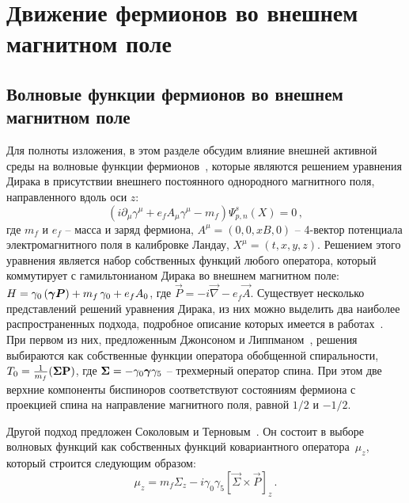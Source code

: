 \section{Движение фермионов во внешнем магнитном поле}\label{Ch:Fermion}
\subsection{Волновые функции фермионов во внешнем магнитном поле}
Для полноты изложения, в этом разделе обсудим влияние внешней активной среды на волновые функции фермионов~\cite{KM_Book_2013}, которые являются решением уравнения Дирака в присутствии внешнего постоянного однородного магнитного поля, направленного вдоль оси $z$:
\begin{equation}\label{eq:Dirac}
	(i\partial_\mu \gamma^\mu + e_f A_\mu \gamma^\mu - m_f) \Psi^s_{p,n}(X)=0\, ,
\end{equation}
где $m_f$ и $e_f$ -- масса и заряд фермиона, $A^\mu=\left(0,0,xB,0\right)$ -- 4-вектор потенциала электромагнитного поля в калибровке 
Ландау, $X^\mu=\left(t,x,y,z\right)$. Решением этого уравнения является набор собственных функций любого оператора, который 
коммутирует с гамильтонианом Дирака во внешнем магнитном поле: $H = \gamma_0 
\left( {\boldsymbol \gamma} {\boldsymbol P} \right) + m_f \, \gamma_0 + e_f A_0$, где $\vec{P} 
= -i \vec{\nabla} - e_f \vec{A}$. Существует несколько представлений решений 
уравнения Дирака, из них можно выделить два наиболее распространенных подхода, 
подробное описание которых имеется в 
работах~\cite{Melrose:1983,Sokolov:1986,Kuznetsov:2003,Bhattacharya:2004,Balantsev:2011,KM_Book_2013}.
 При первом из них, предложенным Джонсоном и Липпманом~\cite{Johnson:1949}, 
решения выбираются как собственные функции оператора обобщенной спиральности, 
$T_0 = \frac{1}{m_f} (\boldsymbol\Sigma \mathbf{P})$, где $\boldsymbol\Sigma = - \gamma_0 
\boldsymbol\gamma \gamma_5$  -- трехмерный оператор спина. При этом две верхние 
компоненты биспиноров соответствуют состояниям фермиона с проекцией спина на 
направление магнитного поля, равной $1/2$ и   $-1/2$.

Другой подход предложен Соколовым и Терновым~\cite{Sokolov:1968}. Он состоит в выборе волновых функций как собственных функций ковариантного оператора~$\mu_z$, который строится следующим образом: 
\begin{equation}\label{eq:muz}
	\mu_z=m_f \Sigma_z - i \gamma_0\gamma_5\left[\vec{\Sigma}\times \vec{P}\right]_z\, .
\end{equation}

